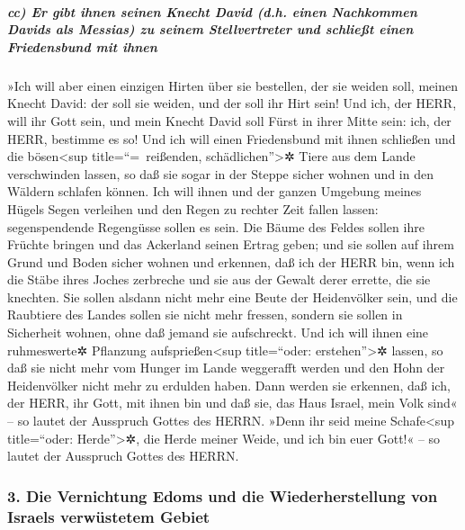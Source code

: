\hypertarget{cc-er-gibt-ihnen-seinen-knecht-david-d.h.-einen-nachkommen-davids-als-messias-zu-seinem-stellvertreter-und-schlieuxdft-einen-friedensbund-mit-ihnen}{%
\subparagraph{cc) Er gibt ihnen seinen Knecht David (d.h. einen
Nachkommen Davids als Messias) zu seinem Stellvertreter und schließt
einen Friedensbund mit
ihnen}\label{cc-er-gibt-ihnen-seinen-knecht-david-d.h.-einen-nachkommen-davids-als-messias-zu-seinem-stellvertreter-und-schlieuxdft-einen-friedensbund-mit-ihnen}}

»Ich will aber einen einzigen Hirten über sie bestellen,
der sie weiden soll, meinen Knecht David: der soll sie weiden, und der
soll ihr Hirt sein! Und ich, der HERR, will ihr Gott
sein, und mein Knecht David soll Fürst in ihrer Mitte sein: ich, der
HERR, bestimme es so! Und ich will einen Friedensbund mit
ihnen schließen und die bösen\textless sup title=``=~reißenden,
schädlichen''\textgreater✲ Tiere aus dem Lande verschwinden lassen, so
daß sie sogar in der Steppe sicher wohnen und in den Wäldern schlafen
können. Ich will ihnen und der ganzen Umgebung meines
Hügels Segen verleihen und den Regen zu rechter Zeit fallen lassen:
segenspendende Regengüsse sollen es sein. Die Bäume des
Feldes sollen ihre Früchte bringen und das Ackerland seinen Ertrag
geben; und sie sollen auf ihrem Grund und Boden sicher wohnen und
erkennen, daß ich der HERR bin, wenn ich die Stäbe ihres Joches
zerbreche und sie aus der Gewalt derer errette, die sie knechten.
Sie sollen alsdann nicht mehr eine Beute der Heidenvölker
sein, und die Raubtiere des Landes sollen sie nicht mehr fressen,
sondern sie sollen in Sicherheit wohnen, ohne daß jemand sie
aufschreckt. Und ich will ihnen eine ruhmeswerte✲
Pflanzung aufsprießen\textless sup title=``oder: erstehen''\textgreater✲
lassen, so daß sie nicht mehr vom Hunger im Lande weggerafft werden und
den Hohn der Heidenvölker nicht mehr zu erdulden haben.
Dann werden sie erkennen, daß ich, der HERR, ihr Gott,
mit ihnen bin und daß sie, das Haus Israel, mein Volk sind« -- so lautet
der Ausspruch Gottes des HERRN. »Denn ihr seid meine
Schafe\textless sup title=``oder: Herde''\textgreater✲, die Herde meiner
Weide, und ich bin euer Gott!« -- so lautet der Ausspruch Gottes des
HERRN.

\hypertarget{die-vernichtung-edoms-und-die-wiederherstellung-von-israels-verwuxfcstetem-gebiet}{%
\subsubsection{3. Die Vernichtung Edoms und die Wiederherstellung von
Israels verwüstetem
Gebiet}\label{die-vernichtung-edoms-und-die-wiederherstellung-von-israels-verwuxfcstetem-gebiet}}

